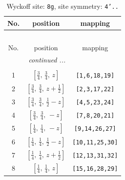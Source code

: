 \documentclass[fleqn,8pt]{jsarticle}
\begin{document}
\begin{longtable}{ccc}
\caption{Wyckoff site: {\tt 8g}, site symmetry: {\tt 4'..}}
 \\
 \hline \hline
No. & position & mapping \\ \hline \endfirsthead

\multicolumn{2}{l}{\tablename\ \thetable{}} \\
 \hline \hline
No. & position & mapping \\ \hline \endhead

 \hline \hline
\multicolumn{2}{r}{\footnotesize\it continued ...} \\ \endfoot

 \hline \hline
\multicolumn{2}{r}{} \\ \endlastfoot

1 & $\left[ \frac{3}{4},\, \frac{3}{4},\, z \right]$ & {\tt [1,6,18,19]} \\ \hline
2 & $\left[ \frac{3}{4},\, \frac{3}{4},\, z + \frac{1}{2} \right]$ & {\tt [2,3,17,22]} \\ \hline
3 & $\left[ \frac{3}{4},\, \frac{3}{4},\, \frac{1}{2} - z \right]$ & {\tt [4,5,23,24]} \\ \hline
4 & $\left[ \frac{3}{4},\, \frac{3}{4},\, - z \right]$ & {\tt [7,8,20,21]} \\ \hline
5 & $\left[ \frac{1}{4},\, \frac{1}{4},\, - z \right]$ & {\tt [9,14,26,27]} \\ \hline
6 & $\left[ \frac{1}{4},\, \frac{1}{4},\, \frac{1}{2} - z \right]$ & {\tt [10,11,25,30]} \\ \hline
7 & $\left[ \frac{1}{4},\, \frac{1}{4},\, z + \frac{1}{2} \right]$ & {\tt [12,13,31,32]} \\ \hline
8 & $\left[ \frac{1}{4},\, \frac{1}{4},\, z \right]$ & {\tt [15,16,28,29]} \\
\end{longtable}
\renewcommand{\arraystretch}{1.2}
\end{document}
